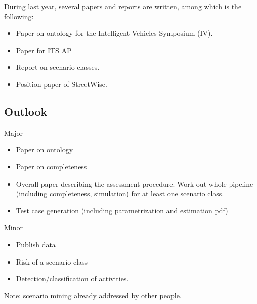 During last year, several papers and reports are written, among which is the following:
\begin{itemize}
	\item Paper on ontology for the Intelligent Vehicles Symposium (IV).
	\item Paper for ITS AP
	\item Report on scenario classes.
	\item Position paper of StreetWise.
\end{itemize}

\subsection{Outlook}
\label{sec:outlook}

Major
\begin{itemize}
	\item Paper on ontology
	\item Paper on completeness
	\item Overall paper describing the assessment procedure. Work out whole pipeline (including completeness, simulation) for at least one scenario class.
	\item Test case generation (including parametrization and estimation pdf)
\end{itemize}

Minor
\begin{itemize}
	\item Publish data
	\item Risk of a scenario class
	\item Detection/classification of activities.
\end{itemize}

Note: scenario mining already addressed by other people.
